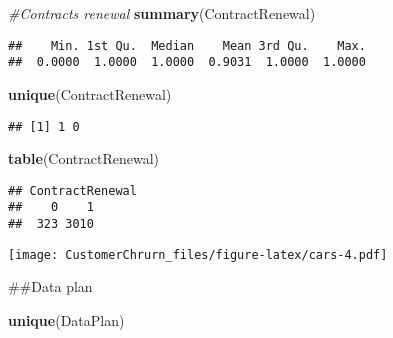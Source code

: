 \documentclass[]{article}
\newenvironment{Shaded}{\begin{snugshade}}{\end{snugshade}}
\newcommand{\KeywordTok}[1]{\textcolor[rgb]{0.13,0.29,0.53}{\textbf{#1}}}
\newcommand{\DataTypeTok}[1]{\textcolor[rgb]{0.13,0.29,0.53}{#1}}
\newcommand{\StringTok}[1]{\textcolor[rgb]{0.31,0.60,0.02}{#1}}
\newcommand{\CommentTok}[1]{\textcolor[rgb]{0.56,0.35,0.01}{\textit{#1}}}
\newcommand{\OperatorTok}[1]{\textcolor[rgb]{0.81,0.36,0.00}{\textbf{#1}}}
\newcommand{\NormalTok}[1]{#1}
\begin{document}
\begin{Shaded}
\begin{Highlighting}[]
\CommentTok{#Contracts renewal}
\KeywordTok{summary}\NormalTok{(ContractRenewal)}
\end{Highlighting}
\end{Shaded}

\begin{verbatim}
##    Min. 1st Qu.  Median    Mean 3rd Qu.    Max. 
##  0.0000  1.0000  1.0000  0.9031  1.0000  1.0000
\end{verbatim}

\begin{Shaded}
\begin{Highlighting}[]
\KeywordTok{unique}\NormalTok{(ContractRenewal)}
\end{Highlighting}
\end{Shaded}

\begin{verbatim}
## [1] 1 0
\end{verbatim}

\begin{Shaded}
\begin{Highlighting}[]
\KeywordTok{table}\NormalTok{(ContractRenewal)}
\end{Highlighting}
\end{Shaded}

\begin{verbatim}
## ContractRenewal
##    0    1 
##  323 3010
\end{verbatim}

\begin{Shaded}
\end{Shaded}

\texttt{[image: CustomerChrurn\_files/figure-latex/cars-4.pdf]}

\begin{Shaded}
\begin{Highlighting}[]
\NormalTok{##Data plan}

\KeywordTok{unique}\NormalTok{(DataPlan)}
\end{Highlighting}
\end{Shaded}
\end{document}

